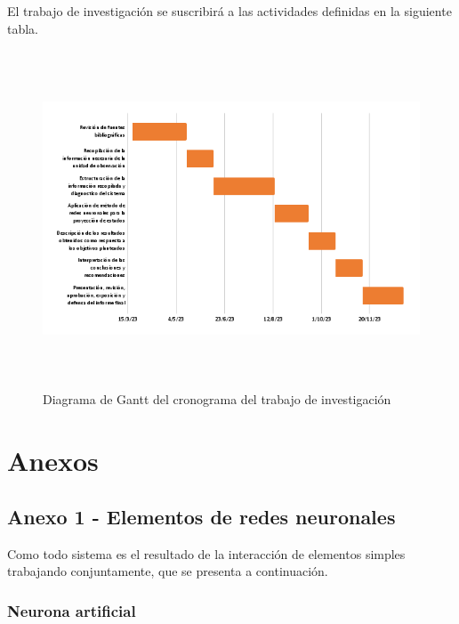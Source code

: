 \documentclass[
  12pt,
]{article}
\begin{document}
El trabajo de investigación se suscribirá a las actividades definidas en
la siguiente tabla.



\begin{figure}
\centering
\includegraphics[width=12cm,height=10cm]{RECURSOS-PLAN-DE-INVESTIGACION/013-CRONOGRAMA-DEL-TRABAJO-DE-INVESTIGACION/gantt.png}
\caption{Diagrama de Gantt del cronograma del trabajo de investigación}
\end{figure}

\newpage

\newpage

\hypertarget{anexos}{%
\section{Anexos}\label{anexos}}

\hypertarget{anexo-1---elementos-de-redes-neuronales}{%
\subsection{Anexo 1 - Elementos de redes
neuronales}\label{anexo-1---elementos-de-redes-neuronales}}

Como todo sistema es el resultado de la interacción de elementos simples
trabajando conjuntamente, que se presenta a continuación.

\hypertarget{neurona-artificial}{%
\subsubsection{Neurona artificial}\label{neurona-artificial}}
\end{document}

